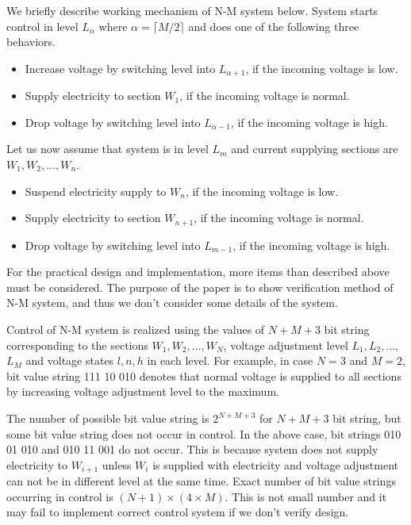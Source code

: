 \documentclass[runningheads,a4paper]{llncs}
\begin{document}
 We briefly describe working mechanism of N-M system below. 
System starts control in level $L_\alpha$ where $\alpha=\lceil M/2 \rceil$  and does one of the following three behaviors. 
\begin{itemize}
\item Increase voltage by switching level into $L_{\alpha+1}$, if the incoming voltage is low.

\item  Supply electricity to section $W_1$, if the incoming voltage is normal. 

\item Drop voltage by switching level into $L_{\alpha-1}$, if the incoming voltage is high.
\end{itemize}

Let us now assume that system is in level $L_m$ and current supplying sections are $W_1, W_2 ,\ldots, W_n$.

\begin{itemize}
\item Suspend electricity supply to $W_n$, if the incoming voltage is low.

\item  Supply electricity to section $W_{n+1}$, if the incoming voltage is normal. 

\item  Drop voltage by switching level into $L_{m-1}$, if the incoming voltage is high.
\end{itemize}

For the practical design and implementation, more items than described above must be considered. The purpose of the paper is to show verification method of N-M system, and thus we don’t consider some details of the system. 

Control of N-M system is realized using the values of $N+M+3$ bit string corresponding to the sections $W_1, W_2 , \ldots, W_N$, voltage adjustment level $L_1, L_2 , \ldots,$ $L_M$ and voltage states $l, n, h$ in each level. For example, in case $N=3$ and $M=2$, bit value string 111 10 010 denotes that normal voltage is supplied to all sections by increasing voltage adjustment level to the maximum. 

The number of possible bit value string is $2^{N+M+3}$ for $N+M+3$ bit string, but some bit value string does not occur in control. In the above case, bit strings 010 01 010 and 010 11 001 do not occur. This is because system does not supply electricity to $W_{i+1}$ unless $W_i$ is supplied with electricity and voltage adjustment can not be in different level at the same time. Exact number of bit value strings occurring in control is $(N+1) \times (4 \times M)$. This is not small number and it may fail to implement correct control system if we don't verify design.
\end{document}
